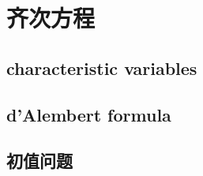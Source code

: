 \section{齐次方程}
\label{b2:sec:0901}


\subsection{characteristic variables}
\label{b2:subsec:090101}

\subsection{d'Alembert formula}
\label{b2:subsec:090102}

\subsection{初值问题}
\label{b2:subsec:090103}


